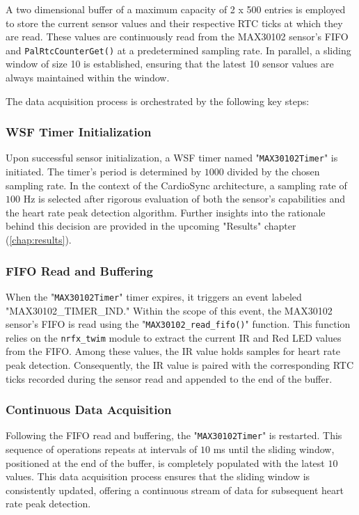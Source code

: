 \noindent A two dimensional buffer of a maximum capacity of 2 x 500 entries is employed to store the current sensor values and their respective RTC ticks at which they are read. These values are continuously read from the MAX30102 sensor's FIFO and \texttt{PalRtcCounterGet()} at a predetermined sampling rate. In parallel, a sliding window of size 10 is established, ensuring that the latest 10 sensor values are always maintained within the window.

\noindent The data acquisition process is orchestrated by the following key steps:

\subsubsection{WSF Timer Initialization}
Upon successful sensor initialization, a WSF timer named "\texttt{MAX30102Timer}" is initiated. The timer's period is determined by \(1000\) divided by the chosen sampling rate. In the context of the CardioSync architecture, a sampling rate of \(100\) Hz is selected after rigorous evaluation of both the sensor's capabilities and the heart rate peak detection algorithm. Further insights into the rationale behind this decision are provided in the upcoming "Results" chapter (\ref{chap:results}).

\subsubsection{FIFO Read and Buffering}
When the "\texttt{MAX30102Timer}" timer expires, it triggers an event labeled "MAX30102\_TIMER\_IND." Within the scope of this event, the MAX30102 sensor's FIFO is read using the "\texttt{MAX30102\_read\_fifo()}" function. This function relies on the \texttt{nrfx\_twim} module to extract the current IR and Red LED values from the FIFO. Among these values, the IR value holds samples for heart rate peak detection. Consequently, the IR value is paired with the corresponding RTC ticks recorded during the sensor read and appended to the end of the buffer.

\subsubsection{Continuous Data Acquisition}
Following the FIFO read and buffering, the "\texttt{MAX30102Timer}" is restarted. This sequence of operations repeats at intervals of \(10\) ms until the sliding window, positioned at the end of the buffer, is completely populated with the latest \(10\) values. This data acquisition process ensures that the sliding window is consistently updated, offering a continuous stream of data for subsequent heart rate peak detection.

